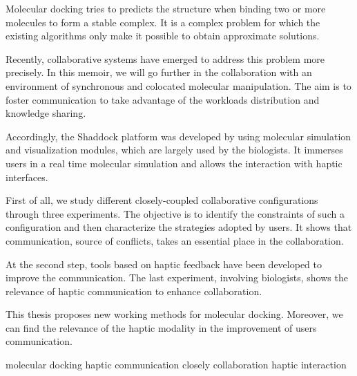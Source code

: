 \documentclass[myfrancais,ngerman,english,french]{mythesis}
\begin{document}
	\begin{myabstract}[english]
		Molecular docking tries to predicts the structure when binding two or more molecules to form a stable complex.
		It is a complex problem for which the existing algorithms only make it possible to obtain approximate solutions.

		Recently, collaborative systems have emerged to address this problem more precisely.
		In this memoir, we will go further in the collaboration with an environment of synchronous and colocated molecular manipulation.
		The aim is to foster communication to take advantage of the workloads distribution and knowledge sharing.

		Accordingly, the Shaddock platform was developed by using molecular simulation and visualization modules, which are largely used by the biologists.
		It immerses users in a real time molecular simulation and allows the interaction with haptic interfaces.

		First of all, we study different closely-coupled collaborative configurations through three experiments.
		The objective is to identify the constraints of such a configuration and then characterize the strategies adopted by users.
		It shows that communication, source of conflicts, takes an essential place in the collaboration.

		At the second step, tools based on haptic feedback have been developed to improve the communication.
		The last experiment, involving biologists, shows the relevance of haptic communication to enhance collaboration.

		This thesis proposes new working methods for molecular docking.
		Moreover, we can find the relevance of the haptic modality in the improvement of users communication.
		\begin{mykeywords}
			\mykeyword molecular docking
			\mykeyword haptic communication
			\mykeyword closely collaboration
			\mykeyword haptic interaction
		\end{mykeywords}
	\end{myabstract}
	\mainmatter
\end{document}
